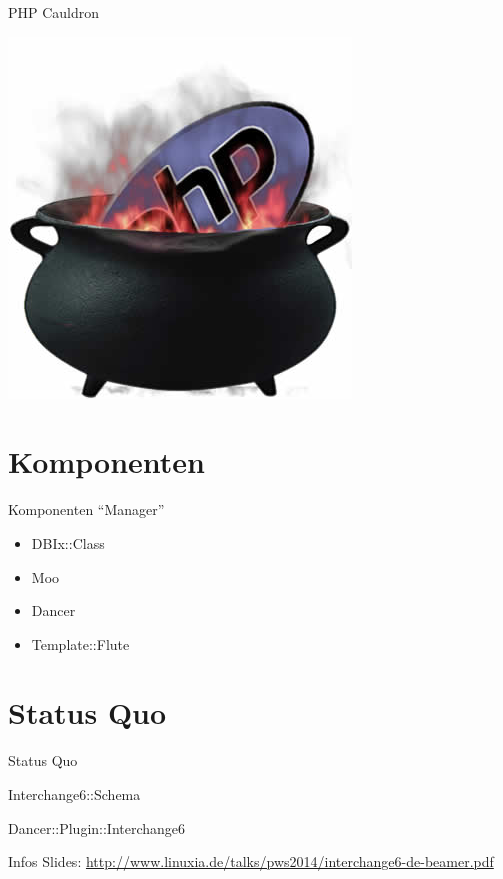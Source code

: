 \begin{frame}{PHP Cauldron}
  \begin{center}
    \includegraphics[width=\textwidth,height=0.8\textheight,keepaspectratio]{images/cauldron.jpg}
  \end{center}
\end{frame}

\section{Komponenten}
\begin{frame}{Komponenten ``Manager''}
  \begin{itemize}
  \item DBIx::Class
  \item Moo
  \item Dancer
  \item Template::Flute
  \end{itemize}
\end{frame}

\section{Status Quo}
\begin{frame}{Status Quo}
 \item Interchange6::Schema
  \item Dancer::Plugin::Interchange6
\end{frame}

\begin{frame}{Infos}
Slides:
\url{http://www.linuxia.de/talks/pws2014/interchange6-de-beamer.pdf}
\end{frame}



